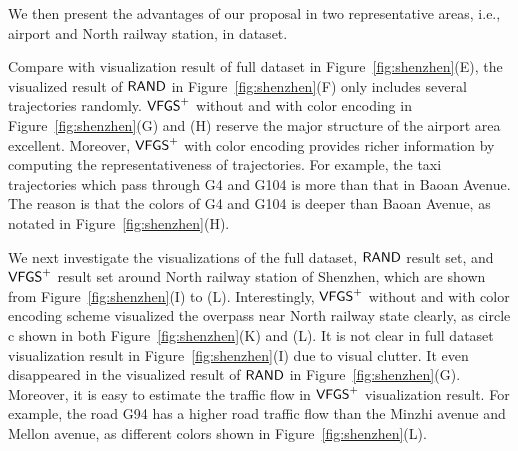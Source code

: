 We then present the advantages of our proposal in two representative areas, i.e., airport and North railway station, in \sz{} dataset.

Compare with visualization result of full dataset in Figure~\ref{fig:shenzhen}(E),
the visualized result of $\mathsf{RAND}$ in Figure~\ref{fig:shenzhen}(F) only includes several trajectories randomly.
$\mathsf{VFGS}^{+}$ without and with color encoding in Figure~\ref{fig:shenzhen}(G) and (H) reserve the major structure of the airport area excellent.
Moreover, $\mathsf{VFGS}^{+}$ with color encoding provides richer information by computing the representativeness of trajectories.
For example, the taxi trajectories which pass through G4 and G104 is more than that in Baoan Avenue.
The reason is that the colors of G4 and G104 is deeper than Baoan Avenue, as notated in Figure~\ref{fig:shenzhen}(H).


We next investigate the visualizations of the full dataset, $\mathsf{RAND}$ result set, and $\mathsf{VFGS}^{+}$ result set around North railway station of Shenzhen, which are shown from Figure~\ref{fig:shenzhen}(I) to (L).
Interestingly, $\mathsf{VFGS}^{+}$ without and with color encoding scheme visualized the overpass near North railway state clearly, as circle c shown in both Figure~\ref{fig:shenzhen}(K) and (L).
It is not clear in full dataset visualization result in Figure~\ref{fig:shenzhen}(I) due to visual clutter.
It even disappeared in the visualized result of $\mathsf{RAND}$ in Figure~\ref{fig:shenzhen}(G).
Moreover, it is easy to estimate the traffic flow in $\mathsf{VFGS}^{+}$ visualization result.
For example, the road G94 has a higher road traffic flow than the Minzhi avenue and Mellon avenue, as different colors shown in Figure~\ref{fig:shenzhen}(L).





